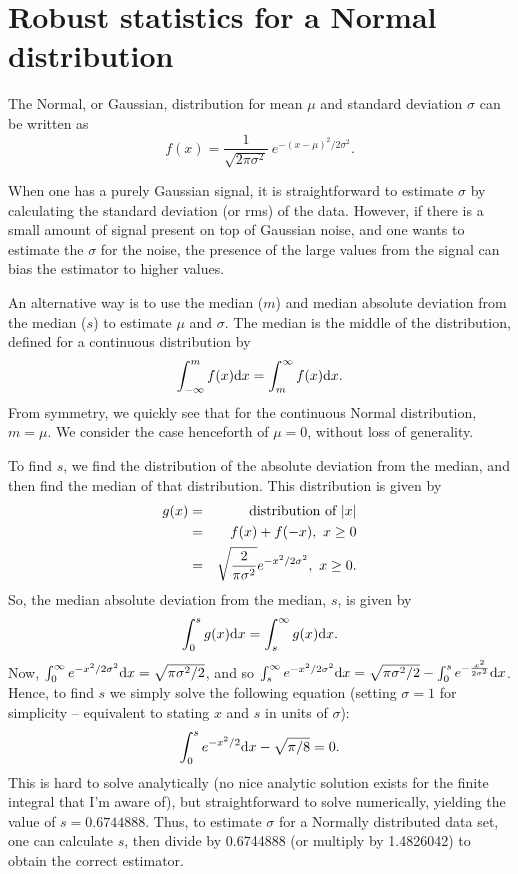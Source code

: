 \documentclass[12pt,a4paper]{article}
\newcommand{\diff}{{\rm d}}
\begin{document}
\section{Robust statistics for a Normal distribution}
\label{app-madfm}

The Normal, or Gaussian, distribution for mean $\mu$ and standard
deviation $\sigma$ can be written as 
\[ 
f(x) = \frac{1}{\sqrt{2\pi\sigma^2}}\ e^{-(x-\mu)^2/2\sigma^2}.
 \]

When one has a purely Gaussian signal, it is straightforward to
estimate $\sigma$ by calculating the standard deviation (or rms) of
the data. However, if there is a small amount of signal present on top
of Gaussian noise, and one wants to estimate the $\sigma$ for the
noise, the presence of the large values from the signal can bias the
estimator to higher values.

An alternative way is to use the median ($m$) and median absolute deviation
from the median ($s$) to estimate $\mu$ and $\sigma$. The median is the
middle of the distribution, defined for a continuous distribution by
\[
\int_{-\infty}^{m} f(x) \diff x = \int_{m}^{\infty} f(x) \diff x.
\]
From symmetry, we quickly see that for the continuous Normal
distribution, $m=\mu$. We consider the case henceforth of $\mu=0$,
without loss of generality.

To find $s$, we find the distribution of the absolute deviation from
the median, and then find the median of that distribution. This
distribution is given by
\begin{eqnarray*}
g(x) &= &{\mbox{\rm distribution of }} |x|\\
     &= &f(x) + f(-x),\ x\ge0\\
     &= &\sqrt{\frac{2}{\pi\sigma^2}} e^{-x^2/2\sigma^2},\ x\ge0.
\end{eqnarray*}
So, the median absolute deviation from the median, $s$, is given by
\[
\int_{0}^{s} g(x) \diff x = \int_{s}^{\infty} g(x) \diff x.
\]
Now, $\int_{0}^{\infty}e^{-x^2/2\sigma^2} \diff x = \sqrt{\pi\sigma^2/2}$, and
so $\int_{s}^{\infty} e^{-x^2/2\sigma^2} \diff x =
\sqrt{\pi\sigma^2/2} - \int_{0}^{s} e^{-\frac{x^2}{2\sigma^2}} \diff x
$. Hence, to find $s$ we simply solve the following equation (setting $\sigma=1$ for
simplicity -- equivalent to stating $x$ and $s$ in units of $\sigma$):
\[
\int_{0}^{s}e^{-x^2/2} \diff x - \sqrt{\pi/8} = 0.
\]
This is hard to solve analytically (no nice analytic solution exists
for the finite integral that I'm aware of), but straightforward to
solve numerically, yielding the value of $s=0.6744888$. Thus, to
estimate $\sigma$ for a Normally distributed data set, one can calculate
$s$, then divide by 0.6744888 (or multiply by 1.4826042) to obtain the
correct estimator.
\end{document}
